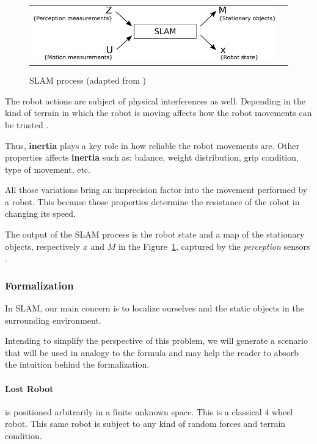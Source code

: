 \begin{figure}[h]
   \centering
     \begin{tabular}{lr}
       \includegraphics[scale=0.9]{img/fig:perception:slam}
     \end{tabular}
   \caption{SLAM process (adapted from \cite{Wang04a})}
   \label{fig:perception:slam}
\end{figure}

The robot actions are subject of physical interferences as well. Depending in the kind of terrain in which the robot is moving affects how the robot movements can be trusted \cite{DBLP:conf/icra/LenainTHM11}. 

Thus, \textbf{inertia} plays a key role in how reliable the robot movements are. Other properties affects \textbf{inertia} such as: balance, weight distribution, grip condition, type of movement, etc.

All those variations bring an imprecision factor into the movement performed by a robot. This because those properties determine the resistance of the robot in changing its speed.

The output of the SLAM process is the robot state and a map of the stationary objects, respectively $x$ and $M$ in the Figure~\ref{fig:perception:slam}, captured by the \textit{perception} sensors \cite{iyengar1991autonomous}.

\subsubsection{Formalization}

In SLAM, our main concern is to localize ourselves and the static objects in the surrounding environment. 

Intending to simplify the perspective of this problem, we will generate a scenario that will be used in analogy to the formula and may help the reader to absorb the intuition behind the formalization.

\paragraph*{Lost Robot} is positioned arbitrarily in a finite unknown space. This is a classical 4 wheel robot. This same robot is subject to any kind of random forces and terrain condition. 

